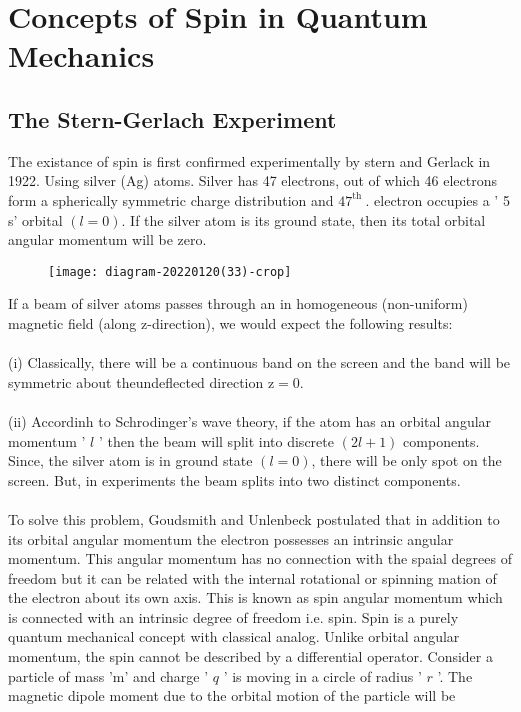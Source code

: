 \section{Concepts of Spin in Quantum Mechanics}
\subsection{ The Stern-Gerlach Experiment}
The existance of spin is first confirmed experimentally by stern and Gerlack in 1922. Using silver (Ag) atoms. Silver has 47 electrons, out of which 46 electrons form a spherically symmetric charge distribution and $47^{\text {th }}$. electron occupies a ' 5 s' orbital $(l=0)$. If the silver atom is its ground state, then its total orbital angular momentum will be zero.\\
\begin{figure}[H]
	\centering
	\texttt{[image: diagram-20220120(33)-crop]}
	\caption{}
	\label{}
\end{figure}
If a beam of silver atoms passes through an in homogeneous (non-uniform) magnetic field (along z-direction), we would expect the following results:\\\\
(i) Classically, there will be a continuous band on the screen and the band will be symmetric about theundeflected direction $\mathrm{z}=0$.\\\\
(ii) Accordinh to Schrodinger's wave theory, if the atom has an orbital angular momentum ' $l$ ' then the beam will split into discrete $(2 l+1)$ components. Since, the silver atom is in ground state $(l=0)$, there will be only spot on the screen.
But, in experiments the beam splits into two distinct components.\\\\
To solve this problem, Goudsmith and Unlenbeck postulated that in addition to its orbital angular momentum the electron possesses an intrinsic angular momentum. This angular momentum has no connection with the spaial degrees of freedom but it can be related with the internal rotational or spinning mation of the electron about its own axis. This is known as spin angular momentum which is connected with an intrinsic degree of freedom i.e. spin. Spin is a purely quantum mechanical concept with classical analog. Unlike orbital angular momentum, the spin cannot be described by a differential operator.
Consider a particle of mass 'm' and charge ' $q$ ' is moving in a circle of radius ' $r$ '. The magnetic dipole moment due to the orbital motion of the particle will be
